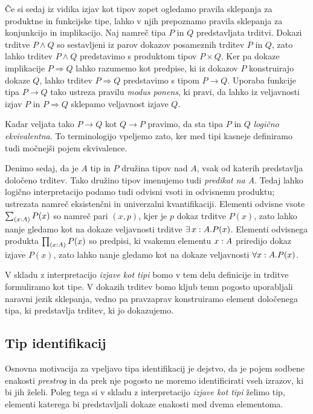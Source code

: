 Če si sedaj iz vidika izjav kot tipov zopet ogledamo pravila sklepanja za produktne in
funkcijske tipe, lahko v njih prepoznamo pravila sklepanja za konjunkcijo in implikacijo. Naj namreč tipa \(P\) in \(Q\) predstavljata trditvi.
Dokazi trditve \(P \wedge Q\) so sestavljeni
iz parov dokazov posameznih trditev \(P\) in \(Q\), zato lahko trditev \(P \wedge Q\) predstavimo s produktom tipov \(P \times Q\). Ker pa dokaze implikacije \(P \Rightarrow Q\) lahko razumemo kot predpise, ki iz dokazov \(P\) konstruirajo dokaze \(Q\), lahko trditev \(P \Rightarrow Q\) predstavimo s tipom \(P \to Q\). Uporaba funkcije tipa \(P \to Q\)
tako ustreza pravilu \emph{modus ponens}, ki pravi, da lahko iz veljavnosti izjav \(P\) in \(P \Rightarrow Q\) sklepamo veljavnost izjave \(Q\).

Kadar veljata tako \(P \to Q\) kot \(Q \to P\) pravimo, da sta tipa \(P\) in \(Q\) \emph{logično ekvivalentna}. To terminologijo vpeljemo zato, ker med tipi kasneje definiramo tudi močnejši pojem ekvivalence.

Denimo sedaj, da je \(A\) tip in \(P\) družina tipov nad \(A\), vsak od katerih predstavlja določeno trditev. Tako družino tipov imenujemo tudi \emph{predikat na A}.
Tedaj lahko logično interpretacijo podamo tudi odvisni vsoti in odvisnemu produktu;
ustrezata namreč eksistenčni in univerzalni kvantifikaciji. Elementi odvisne vsote
\(\textstyle \sum_{\left( {x : A} \right)} P(x)\) so namreč pari \((x, p)\), kjer je \(p\) dokaz trditve \(P(x)\), zato lahko nanje gledamo kot na dokaze veljavnosti trditve \(\exists\, {x : A}. P(x)\). Elementi odvisnega produkta
\(\textstyle \prod_{\left( {x : A} \right)} P(x)\) so predpisi, ki vsakemu elementu \({x : A}\) priredijo
dokaz izjave \(P(x)\), zato lahko nanje gledamo kot na dokaze veljavnosti
\(\forall {x : A}.P(x)\).

V skladu z interpretacijo \emph{izjave kot tipi} bomo v tem delu definicije in trditve formuliramo kot tipe.
V dokazih trditev bomo kljub temu pogosto uporabljali naravni jezik sklepanja, vedno pa pravzaprav konstruiramo element določenega tipa, ki predstavlja trditev, ki jo dokazujemo.

\subsection{Tip identifikacij}
Osnovna motivacija za vpeljavo tipa identifikacij je dejstvo, da je pojem sodbene enakosti
\emph{prestrog} in da prek nje pogosto ne moremo identificirati vseh izrazov, ki bi
jih želeli. Poleg tega si v skladu z interpretacijo \emph{izjave kot tipi} želimo tip, elementi
katerega bi predstavljali dokaze enakosti med dvema elementoma.

